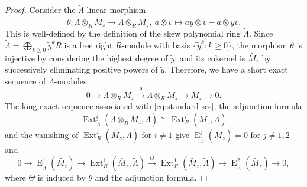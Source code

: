 \documentclass[11pt,a4paper]{article} %
\def\E{\operatorname{E}}
\def\Ext{\operatorname{Ext}} %
\begin{document}
\begin{proof}
    Consider the $\widetilde{\Lambda}$-linear morphism 
    \[
    \theta:\widetilde{\Lambda}\otimes_R\widetilde{M_z}\longrightarrow\widetilde{\Lambda}\otimes_R\widetilde{M_z},~a\otimes v\mapsto a\widetilde{y}\otimes v-a\otimes\widetilde{y}v.
    \]
    This is well-defined by the definition of the skew polynomial ring $\widetilde{\Lambda}$. Since $\widetilde{\Lambda}=\bigoplus_{k\ge0}\widetilde{y}^kR$ is a free right $R$-module with basis $\{\widetilde{y}^k:k\ge0\}$, the morphism $\theta$ is injective
    by considering the highest degree of $\widetilde{y}$, and its cokernel is $\widetilde{M_z}$ by successively eliminating positive powers of $\widetilde{y}$. Therefore, we have a short exact sequence of $\widetilde{\Lambda}$-modules 
    \begin{equation}\label{eq:standard-ses}
    0\longrightarrow \widetilde{\Lambda}\otimes_R\widetilde{M_z}
    \xrightarrow{\,\theta\,}\widetilde{\Lambda}\otimes_R\widetilde{M_z}
    \longrightarrow\widetilde{M_z}\longrightarrow0.
    \end{equation}
    The long exact sequence associated with \eqref{eq:standard-ses}, the adjunction formula 
    \[
    \Ext_{\widetilde{\Lambda}}^i(\widetilde{\Lambda}\otimes_R\widetilde{M_z},\widetilde{\Lambda})
    \cong\Ext_R^i(\widetilde{M_z},\widetilde{\Lambda})
    \]
    and the vanishing of $\Ext_R^i(\widetilde{M_z},\widetilde{\Lambda})$ for $i\ne1$ give $\E^j_{\widetilde{\Lambda}}(\widetilde{M_z})=0$ for $j\ne1,2$ and
    \[
    0\longrightarrow\E^1_{\widetilde{\Lambda}}(\widetilde{M_z})\longrightarrow\Ext_R^1(\widetilde{M_z},\widetilde{\Lambda})
    \xrightarrow{\,\Theta\,}\Ext_R^1(\widetilde{M_z},\widetilde{\Lambda})\longrightarrow\E^2_{\widetilde{\Lambda}}(\widetilde{M_z})\longrightarrow0,
    \]
    where $\Theta$ is induced by $\theta$ and the adjunction formula.


\end{proof}
\end{document}

